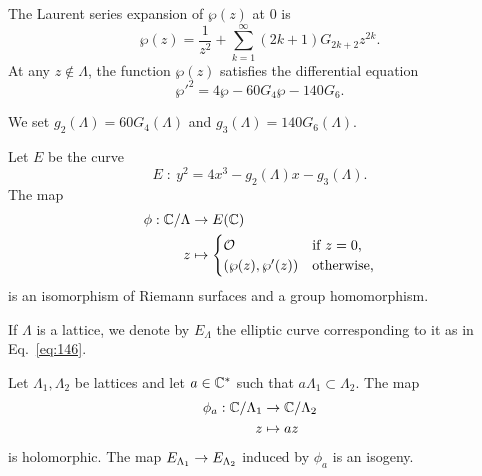 \begin{theorem}
  The Laurent series expansion of $\wp(z)$ at $0$ is
  \begin{equation}
    \label{eq:144}
    \wp(z) = \frac{1}{z^2} + \sum_{k=1}^\infty (2k+1)G_{2k+2}z^{2k}
    \text{.}
  \end{equation}
  At any $z\not\in\Lambda$, the function $\wp(z)$ satisfies the
  differential equation
  \begin{equation}
    \label{eq:145}
    {\wp'}^2 = 4\wp - 60G_4\wp - 140G_6
    \text{.}
  \end{equation}
\end{theorem}

We set $g_2(\Lambda)=60G_4(\Lambda)$ and $g_3(\Lambda)=140G_6(\Lambda)$.

\begin{theorem}
  Let $E$ be the curve 
  \begin{equation}
    \label{eq:146}
    E\;:\: y^2=4x^3-g_2(\Lambda)x-g_3(\Lambda)
    \text{.}
  \end{equation}
  The map
  \begin{equation}
    \label{eq:147}
    \begin{aligned}
      \phi: \mathbb{C}/\Lambda &\rightarrow E(\mathbb{C})\\
      z &\mapsto
      \begin{cases}
        \mathcal{O} &\text{if $z=0$,}\\
        (\wp(z), \wp'(z)) &\text{otherwise,}
      \end{cases}
    \end{aligned}
  \end{equation}
  is an isomorphism of Riemann surfaces and a group homomorphism. 
\end{theorem}

If $\Lambda$ is a lattice, we denote by $E_\Lambda$ the elliptic curve
corresponding to it as in Eq.~\eqref{eq:146}.

\begin{theorem}
  Let $\Lambda_1,\Lambda_2$ be lattices and let $a\in\mathbb{C}^\ast$ such that
  $a\Lambda_1\subset\Lambda_2$. The map
  \begin{equation}
    \label{eq:148}
    \begin{aligned}
      \phi_a:\mathbb{C}/\Lambda_1&\rightarrow\mathbb{C}/\Lambda_2\\
      z&\mapsto az
    \end{aligned}
  \end{equation}
  is holomorphic. The map $E_{\Lambda_1}\rightarrow E_{\Lambda_2}$ induced by
  $\phi_a$ is an isogeny.
\end{theorem}

